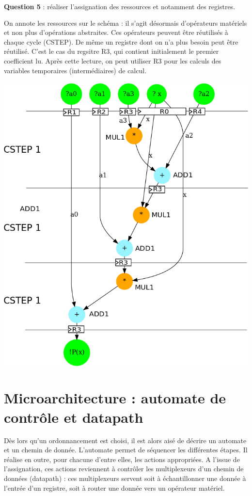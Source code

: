 \documentclass[a4paper,11pt]{exam}
\begin{document}
\begin{questions}
  \question \textbf{Question 5} : réaliser l'assignation des ressources et notamment des registres.
  \begin{solution}
    On annote les ressources sur le schéma : il s'agit désormais d'opérateurs matériels et non plus d'opérations abstraites. Ces opérateurs peuvent être réutilisés à chaque cycle (CSTEP).
    De même un registre dont on n'a plus besoin peut être réutilisé. C'est le cas du regsitre R3, qui contient initialement le premier coefficient lu. Après cette lecture, on peut utiliser R3 pour les calculs des variables temporaires (intermédiaires) de calcul.
    \begin{center}
      \includegraphics[scale=0.4]{dfg_horner_binding.png}
    \end{center}
  \end{solution}
\end{questions}

\section{Microarchitecture : automate de contrôle et datapath}
Dès lors qu'un ordonnancement est choisi, il est alors aisé de décrire un automate et un chemin de donnée. L'automate permet de séquencer les différentes étapes. Il réalise en outre, pour chacune d'entre elles, les actions appropriées. A l'issue de l'assignation, ces actions reviennent à contrôler les multiplexeurs d'un chemin de données (datapath) : ces multiplexeurs servent soit à échantillonner une donnée à l'entrée d'un registre, soit à router une donnée vers un opérateur matériel.\\
\end{document}
